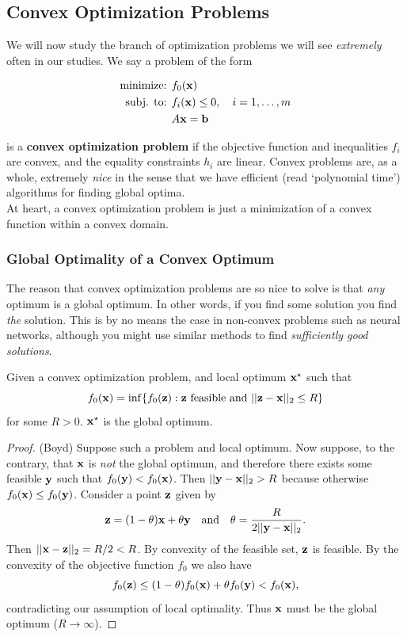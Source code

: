 \documentclass{article}
\begin{document}
\subsection{Convex Optimization Problems}

We will now study the branch of optimization problems we will see
\textit{extremely} often in our studies. We say a problem of the
form

\begin{align*}
    \text{minimize: } & f_0({\bf x})\\
    \text{subj. to: } & f_i({\bf x}) \leq 0, \quad i=1,\dots,m\\
                      & A{\bf x} = {\bf b}
\end{align*}

is a \textbf{convex optimization problem} if the objective function
and inequalities $f_i$ are convex, and the equality constraints
$h_i$ are linear. Convex problems are, as a whole, extremely \textit{nice}
in the sense that we have efficient (read `polynomial time') algorithms
for finding global optima.\\

At heart, a convex optimization problem is 
just a minimization of a convex function within a convex domain.


\subsubsection{Global Optimality of a Convex Optimum}

The reason that convex optimization problems are so nice to solve
is that \textit{any} optimum is a global optimum. In other words,
if you find some solution you find \textit{the} solution. This is
by no means the case in non-convex problems such as neural networks,
although you might use similar methods to find \textit{sufficiently
good solutions}.

\begin{theorem}
    Given a convex optimization problem, and local optimum ${\bf x}^\star$
    such that
    \[
        f_0({\bf x}) = \inf\{f_0({\bf z}) : {\bf z}\text{ feasible and } ||{\bf z}-{\bf x}||_2 \leq R\}
    \]
    for some $R > 0$. ${\bf x}^\star$ is the global optimum.
\end{theorem}
\begin{proof}
    (Boyd)
    Suppose such a problem and local optimum. Now suppose, to the
    contrary, that ${\bf x}$ is \textit{not} the global optimum,
    and therefore there exists some feasible ${\bf y}$ such that $f_0({\bf y})
    < f_0({\bf x})$. Then $||{\bf y}-{\bf x}||_2 >R$ because otherwise $f_0({\bf x})
    \leq f_0({\bf y})$. Consider a point ${\bf z}$ given by
    \[
        {\bf z} = (1-\theta){\bf x}+ \theta{\bf y} \quad\text{and}\quad \theta=\frac{R}{2||{\bf y}-{\bf x}||_2}.
    \]
    Then $||{\bf x}-{\bf z}||_2=R/2 < R$. By convexity of the feasible set,
    ${\bf z}$ is feasible. By the convexity of the objective function $f_0$
    we also have
    \[
        f_0({\bf z}) \leq (1-\theta)f_0({\bf x}) + \theta f_0({\bf y}) < f_0({\bf x}),
    \]
    contradicting our assumption of local optimality. Thus ${\bf x}$
    must be the global optimum ($R\to\infty$).
\end{proof}
\end{document}
